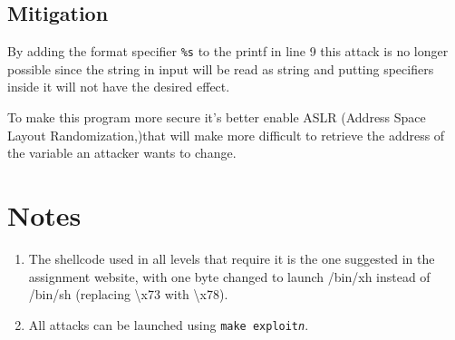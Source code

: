 \documentclass[a4paper,12pt]{article}
\begin{document}
\subsection{Mitigation}

By adding the format specifier \texttt{\%s} to the printf in line 9 this attack is no longer possible since the string in input will be read as string and putting specifiers inside it will not have the desired effect.

To make this program more secure it's better enable ASLR (Address Space Layout Randomization,)that will make more difficult to retrieve the address of the variable an attacker wants to change. 


\section{Notes}
\begin{enumerate}


\item The shellcode used in all levels that require it is the one suggested in the assignment website, with one byte changed to launch /bin/xh instead of /bin/sh (replacing \textbackslash x73 with \textbackslash x78).


\item All attacks can be launched using \texttt{make exploit\textit{n}}.
\end{enumerate}
\end{document}
